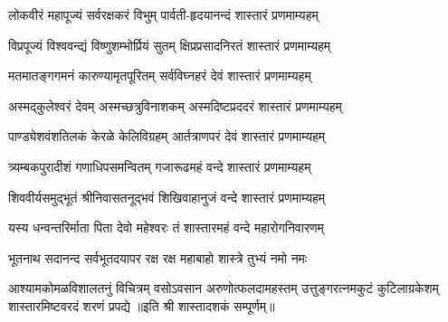 
\twolineshloka
{लोकवीरं महापूज्यं सर्वरक्षकरं विभुम्}
{पार्वती-हृदयानन्दं शास्तारं प्रणमाम्यहम्}

\twolineshloka
{विप्रपूज्यं विश्ववन्द्यं विष्णुशम्भोर्प्रियं सुतम्}
{क्षिप्रप्रसादनिरतं शास्तारं प्रणमाम्यहम्}

\twolineshloka
{मतमातङ्गगमनं कारुण्यामृतपूरितम्}
{सर्वविघ्नहरं देवं शास्तारं प्रणमाम्यहम्}

\twolineshloka
{अस्मद्कुलेश्वरं देवम् अस्मच्छत्रुविनाशकम्}
{अस्मदिष्टप्रददरं शास्तारं प्रणमाम्यहम्}

\twolineshloka
{पाण्ड्येशवंशतिलकं केरळे केलिविग्रहम्}
{आर्तत्राणपरं देवं शास्तारं प्रणमाम्यहम्}

\twolineshloka
{त्र्यम्बकपुरादीशं गणाधिपसमन्वितम्}
{गजारूढमहं वन्दे शास्तारं प्रणमाम्यहम्}

\twolineshloka
{शिववीर्यसमुद्भूतं श्रीनिवासतनूद्भवं}
{शिखिवाहानुजं वन्दे शास्तारं प्रणमाम्यहम्}

\twolineshloka
{यस्य धन्वन्तरिर्माता पिता देवो महेश्वरः}
{तं शास्तारमहं वन्दे महारोगनिवारणम्}

\twolineshloka
{भूतनाथ सदानन्द सर्वभूतदयापर}
{रक्ष रक्ष महाबाहो शास्त्रे तुभ्यं नमो नमः}

\fourlineindentedshloka
{आश्यामकोमळविशालतनुं विचित्रम्}
{वसोऽवसान अरुणोत्फलदामहस्तम्}
{उत्तुङ्गरत्नमकुटं कुटिलाग्रकेशम्}
{शास्तारमिष्टवरदं शरणं प्रपद्ये}
॥इति श्री शास्तादशकं सम्पूर्णम्॥
